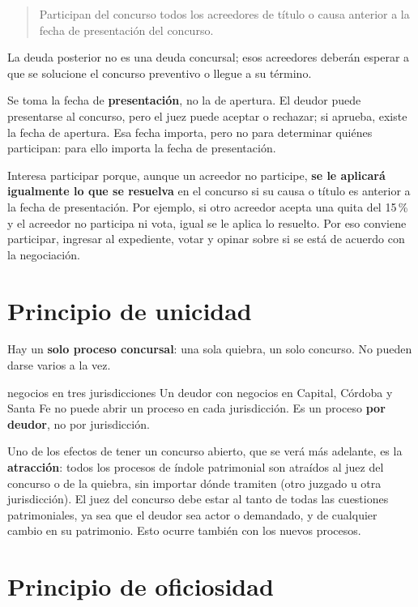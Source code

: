 \documentclass[12pt,oneside]{book}
\begin{document}
\begin{quote}
Participan del concurso todos los acreedores de título o causa anterior a la fecha de presentación del concurso.
\end{quote}

La deuda posterior no es una deuda concursal; esos acreedores deberán esperar a que se solucione el concurso preventivo o llegue a su término.

\begin{important}
Se toma la fecha de \textbf{presentación}, no la de apertura. El deudor puede presentarse al concurso, pero el juez puede aceptar o rechazar; si aprueba, existe la fecha de apertura. Esa fecha importa, pero no para determinar quiénes participan: para ello importa la fecha de presentación.
\end{important}

Interesa participar porque, aunque un acreedor no participe, \textbf{se le aplicará igualmente lo que se resuelva} en el concurso si su causa o título es anterior a la fecha de presentación. Por ejemplo, si otro acreedor acepta una quita del 15\,\% y el acreedor no participa ni vota, igual se le aplica lo resuelto. Por eso conviene participar, ingresar al expediente, votar y opinar sobre si se está de acuerdo con la negociación.

\section{Principio de unicidad}

Hay un \textbf{solo proceso concursal}: una sola quiebra, un solo concurso. No pueden darse varios a la vez.

\begin{example}{negocios en tres jurisdicciones}
Un deudor con negocios en Capital, Córdoba y Santa Fe no puede abrir un proceso en cada jurisdicción. Es un proceso \textbf{por deudor}, no por jurisdicción.
\end{example}

Uno de los efectos de tener un concurso abierto, que se verá más adelante, es la \textbf{atracción}: todos los procesos de índole patrimonial son atraídos al juez del concurso o de la quiebra, sin importar dónde tramiten (otro juzgado u otra jurisdicción). El juez del concurso debe estar al tanto de todas las cuestiones patrimoniales, ya sea que el deudor sea actor o demandado, y de cualquier cambio en su patrimonio. Esto ocurre también con los nuevos procesos.

\section{Principio de oficiosidad}
\end{document}
